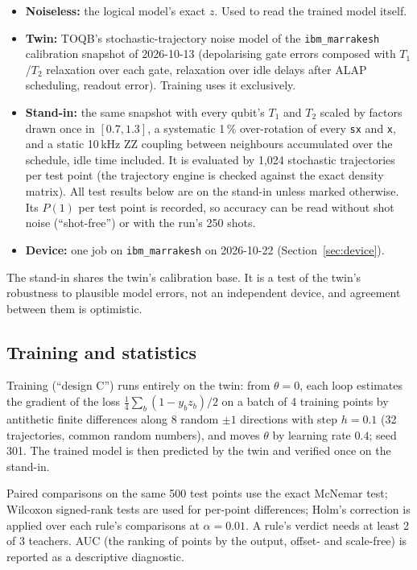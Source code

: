 \documentclass[11pt]{article}
\begin{document}
\begin{itemize}
\item \textbf{Noiseless:} the logical model's exact $z$. Used to read the trained model itself.
\item \textbf{Twin:} TOQB's stochastic-trajectory noise model of the \texttt{ibm\_marrakesh} calibration snapshot of
2026-10-13 (depolarising gate errors composed with $T_1$/$T_2$ relaxation over each gate, relaxation over idle
delays after ALAP scheduling, readout error). Training uses it exclusively.
\item \textbf{Stand-in:} the same snapshot with every qubit's $T_1$ and $T_2$ scaled by factors drawn once in
$[0.7, 1.3]$, a systematic 1\,\% over-rotation of every \texttt{sx} and \texttt{x}, and a static 10\,kHz ZZ coupling
between neighbours accumulated over the schedule, idle time included. It is evaluated by 1{,}024 stochastic
trajectories per test point (the trajectory engine is checked against the exact density matrix). All test results
below are on the stand-in unless marked otherwise. Its $P(1)$ per test point is recorded, so accuracy can be read
without shot noise (``shot-free'') or with the run's 250 shots.
\item \textbf{Device:} one job on \texttt{ibm\_marrakesh} on 2026-10-22 (Section~\ref{sec:device}).
\end{itemize}

The stand-in shares the twin's calibration base. It is a test of the twin's robustness to plausible model errors,
not an independent device, and agreement between them is optimistic.

\subsection{Training and statistics}

Training (``design C'') runs entirely on the twin: from $\theta = 0$, each loop estimates the gradient of the loss
$\tfrac{1}{4}\sum_{b}(1 - y_b z_b)/2$ on a batch of 4 training points by antithetic finite differences along 8 random
$\pm 1$ directions with step $h = 0.1$ (32 trajectories, common random numbers), and moves $\theta$ by learning rate
$0.4$; seed 301. The trained model is then predicted by the twin and verified once on the stand-in.

Paired comparisons on the same 500 test points use the exact McNemar test; Wilcoxon signed-rank tests are used for
per-point differences; Holm's correction is applied over each rule's comparisons at $\alpha = 0.01$. A rule's verdict
needs at least 2 of 3 teachers. AUC (the ranking of points by the output, offset- and scale-free) is reported as a
descriptive diagnostic.
\end{document}
